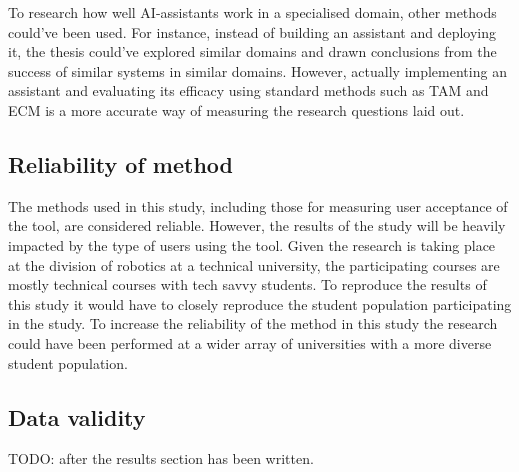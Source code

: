 

To research how well AI-assistants work in a specialised domain, other methods could’ve been used. For instance, instead of building an assistant and deploying it, the thesis could’ve explored similar domains and drawn conclusions from the success of similar systems in similar domains. However, actually implementing an assistant and evaluating its efficacy using standard methods such as \gls{TAM} and \gls{ECM} is a more accurate way of measuring the research questions laid out.


\subsection{Reliability of method}
\label{sec:reliabilityOfMethod}




The methods used in this study, including those for measuring user acceptance of the tool, are considered reliable. However, the results of the study will be heavily impacted by the type of users using the tool. Given the research is taking place at the division of robotics at a technical university, the participating courses are mostly technical courses with tech savvy students. To reproduce the results of this study it would have to closely reproduce the student population participating in the study. To increase the reliability of the method in this study the research could have been performed at a wider array of universities with a more diverse student population.


\subsection{Data validity}
\label{sec:dataValidity}



TODO: after the results section has been written.


